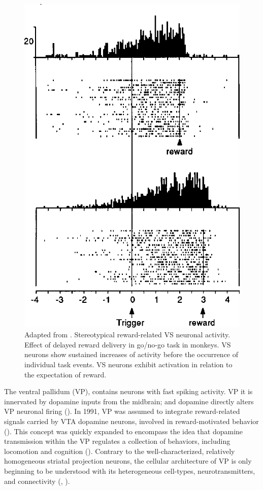 \begin{figure}[H]
    \centering
    \includegraphics[scale=0.22]{figures/StriatumR.png}
    \caption{Adapted from . Stereotypical reward-related VS neuronal activity. Effect of delayed reward delivery in go/no-go task in monkeys. VS neurons show sustained increases of activity before the occurrence of individual task events. VS neurons exhibit activation in relation to the expectation of reward.}
    \label{fig:StriatumN}
\end{figure}
The ventral pallidum (VP), contains neurons with fast spiking activity. VP it is innervated by dopamine inputs from the midbrain; and dopamine directly alters VP neuronal firing (\cite{Napier89}). In 1991, VP was assumed to integrate reward-related signals carried by VTA dopamine neurons, involved in reward-motivated behavior (\cite{Napier91}). This concept was quickly expanded to encompass the idea that dopamine transmission within the VP regulates a collection of behaviors, including locomotion and cognition (\cite{Napier92}). Contrary to the well-characterized, relatively homogeneous striatal projection neurons, the cellular architecture of VP is only beginning to be understood with its heterogeneous cell-types, neurotransmitters, and connectivity (\cite{Heimer1997}, \cite{Tachibana2012}). 
